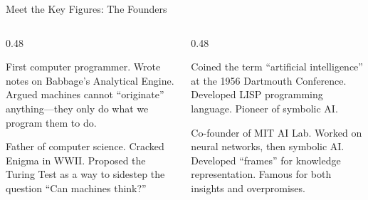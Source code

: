 ﻿\documentclass[aspectratio=169,11pt]{beamer}
\begin{document}
\begin{frame}{Meet the Key Figures: The Founders}
\begin{columns}[T]
\begin{column}{0.48\textwidth}
\begin{figurebox}
\scriptsize
First computer programmer. Wrote notes on Babbage's Analytical Engine. Argued machines cannot ``originate'' anything---they only do what we program them to do.
\end{figurebox}

\vspace{0.2em}
\begin{figurebox}
\scriptsize
Father of computer science. Cracked Enigma in WWII. Proposed the Turing Test \parencite{turing_computing_machinery} as a way to sidestep the question ``Can machines think?''
\end{figurebox}
\end{column}
\begin{column}{0.48\textwidth}
\begin{figurebox}
\scriptsize
Coined the term ``artificial intelligence'' at the 1956 Dartmouth Conference. Developed LISP programming language. Pioneer of symbolic AI.
\end{figurebox}

\vspace{0.2em}
\begin{figurebox}
\scriptsize
Co-founder of MIT AI Lab. Worked on neural networks, then symbolic AI. Developed ``frames'' for knowledge representation. Famous for both insights and overpromises.
\end{figurebox}
\end{column}
\end{columns}
\end{frame}
\end{document}
